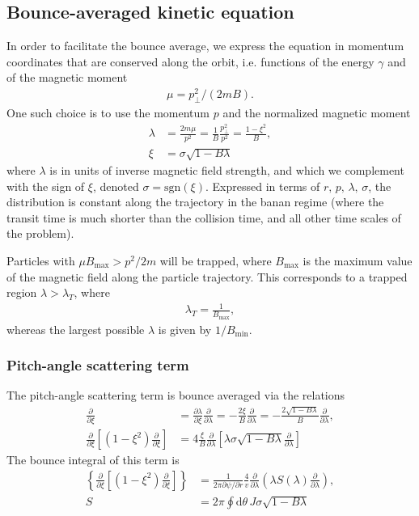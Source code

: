 \documentclass[11pt,a4paper]{article}
\newcommand{\rd}{\ensuremath{\mathrm{d}}}
\newcommand{\sub}[1]{\ensuremath{_{\text{#1}}}}
\begin{document}
\subsection{Bounce-averaged kinetic equation}
In order to facilitate the bounce average, we express the equation in momentum coordinates that are conserved along the orbit, i.e. functions of the energy $\gamma$ and of the magnetic moment 
\begin{align}
\mu = p_\perp^2/(2mB).
\end{align}
One such choice is to use the momentum $p$ and the normalized magnetic moment
\begin{align}
\lambda &= \frac{2m\mu}{p^2} = \frac{1}{B}\frac{p_\perp^2}{p^2}= \frac{1-\xi^2}{B}, \nonumber \\
\xi &= \sigma \sqrt{1-B\lambda}
\end{align}
where $\lambda$ is in units of inverse magnetic field strength, and which we complement with the sign of $\xi$, denoted $\sigma = \text{sgn}(\xi)$. Expressed in terms of $r,\,p,\,\lambda,\,\sigma$, the distribution is constant along the trajectory in the banan regime (where the transit time is much shorter than the collision time, and all other time scales of the problem).

Particles with $\mu B\sub{max} > p^2/2m$ will be trapped, where $B\sub{max}$ is the maximum value of the magnetic field along the particle trajectory. This corresponds to a trapped region $\lambda > \lambda_{T}$, where
\begin{align}
\lambda_T = \frac{1}{B\sub{max}},
\end{align}
whereas the largest possible $\lambda$ is given by $1/B\sub{min}$.

\subsubsection*{Pitch-angle scattering term}
The pitch-angle scattering term is bounce averaged via the relations
\begin{align}
\frac{\partial}{\partial \xi} &= \frac{\partial \lambda}{\partial \xi} \frac{\partial}{\partial \lambda} = -\frac{2\xi}{B}\frac{\partial}{\partial \lambda} = -\frac{2\sqrt{1-B\lambda}}{B}\frac{\partial}{\partial \lambda}, \nonumber \\
\frac{\partial}{\partial \xi}\left[(1-\xi^2)\frac{\partial}{\partial \xi} \right] &= 4\frac{\xi}{B} \frac{\partial}{\partial \lambda}  \left[\lambda \sigma \sqrt{1-B\lambda}\frac{\partial}{\partial \lambda}\right]
\end{align}
The bounce integral of this term is
\begin{align}
\left\{ \frac{\partial}{\partial \xi}\left[(1-\xi^2)\frac{\partial}{\partial \xi} \right]\right\} &= \frac{1}{2\pi\partial \psi/\partial r} \frac{4}{ v}\frac{\partial}{\partial \lambda}\left(\lambda S(\lambda)\frac{\partial}{\partial \lambda}\right), \nonumber \\
S &= 2\pi \oint \rd \theta \,J\sigma\sqrt{1-B\lambda}
\end{align}
\end{document}
